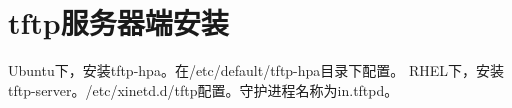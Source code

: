\section{tftp服务器端安装}
Ubuntu下，安装tftp-hpa。在/etc/default/tftp-hpa目录下配置。
RHEL下，安装tftp-server。/etc/xinetd.d/tftp配置。守护进程名称为in.tftpd。
